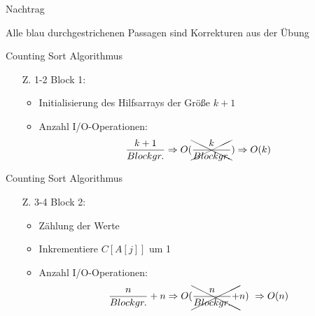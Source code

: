 \documentclass{beamer}
\def \korrekturfarbe {blue}
\begin{document}
\begin{frame}{Nachtrag}
  \begin{center}
    Alle {\color{\korrekturfarbe}blau} durchgestrichenen Passagen sind Korrekturen aus der Übung
  \end{center}
\end{frame}

\begin{frame}{Counting Sort Algorithmus}

  \begin{itemize}
    \item[Z. 1-2] Block 1:
    \begin{itemize}
      \item Initialisierung des Hilfsarrays der Größe $k+1$
      \item Anzahl I/O-Operationen:
            \[
              \frac{k+1}{Blockgr.} \Rightarrow O(\xcancel{\frac{k}{Blockgr.}}) \Rightarrow O(k)
            \]
    \end{itemize}
  \end{itemize}
  \vspace{1cm}
  \begin{figure}
    \flushright
  \end{figure}
\end{frame}

\begin{frame}{Counting Sort Algorithmus}
  \begin{itemize}
    \item[Z. 3-4] Block 2:
    \begin{itemize}
      \item Zählung der Werte
      \item Inkrementiere $C[A[j]]$ um 1
      \item Anzahl I/O-Operationen:
            \[
              \frac{n}{Blockgr.} + n \Rightarrow O(\xcancel{\frac{n}{Blockgr.} +} n) ~
              \Rightarrow O(n)
            \]
    \end{itemize}
  \end{itemize}
  \vspace{1cm}
  \begin{figure}
    \flushright
  \end{figure}
\end{frame}
\end{document}
